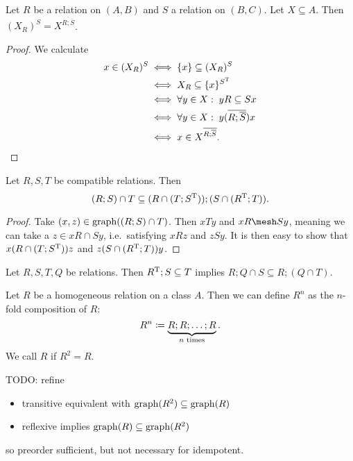 \begin{lemma}
Let $R$ be a relation on $(A,B)$ and $S$ a relation on $(B,C)$. Let $X\subseteq A$. Then $(X_R)^S = X^{\overline{R;\overline{S}}}$.
\end{lemma}
\begin{proof}
We calculate
\begin{align*}
x\in (X_R)^S &\iff \{x\} \subseteq (X_R)^S \\
&\iff X_R \subseteq \{x\}^{S^{\mathrm{T}}} \\
&\iff \forall y\in X:\; yR \subseteq Sx \\
&\iff \forall y\in X:\; y(\overline{R; \overline{S}})x \\
&\iff x\in X^{\overline{R;\overline{S}}}.
\end{align*}
\end{proof}

\begin{proposition} \label{DedekindFormula}
Let $R,S,T$ be compatible relations. Then
\[ (R;S)\cap T \subseteq (R\cap (T; S^{\mathrm{T}}));(S\cap (R^{\mathrm{T}};T)). \]
\end{proposition}
\begin{proof}
Take $(x,z)\in \operatorname{graph}((R;S)\cap T)$. Then $xTy$ and $xR \mesh Sy$, meaning we can take a $z\in xR\cap Sy$, i.e.\ satisfying $xRz$ and $zSy$. It is then easy to show that $x(R\cap (T; S^{\mathrm{T}}))z$ and $z(S\cap (R^{\mathrm{T}};T))y$.
\end{proof}

\begin{lemma}
Let $R,S,T, Q$ be relations. Then $R^{\mathrm{T}}; S \subseteq T$ implies $R;Q\cap S \subseteq R; (Q\cap T)$.
\end{lemma}

\begin{definition}
Let $R$ be a homogeneous relation on a class $A$. Then we can define $R^n$ as the $n$-fold composition of $R$:
\[ R^n \coloneqq \underbrace{R;R; \ldots ;R}_{\text{$n$ times}}. \]
We call $R$  if $R^2 = R$.
\end{definition}

TODO: refine
\begin{proposition}
\begin{itemize}
\item transitive equivalent with $\operatorname{graph}(R^2) \subseteq \operatorname{graph}(R)$
\item reflexive implies $\operatorname{graph}(R) \subseteq \operatorname{graph}(R^2)$
\end{itemize}
\end{proposition}
so preorder sufficient, but not necessary for idempotent.

